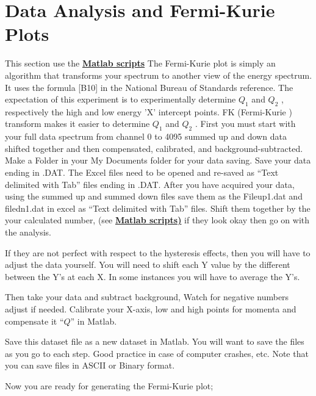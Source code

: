 \documentclass{../lab}
\begin{document}
\section{Data Analysis and Fermi-Kurie Plots}

This section use the \href{http://experimentationlab.berkeley.edu/matlabfitting}{\textbf{Matlab scripts}} The Fermi-Kurie plot is simply an algorithm that transforms your spectrum to another view of the energy spectrum. It uses the formula [B10] in the National Bureau of Standards reference. The expectation of this experiment is to experimentally determine $Q_1$ and $Q_2$ , respectively the high and low energy 'X' intercept points. FK (Fermi-Kurie ) transform makes it easier to determine $Q_1$ and $Q_2$ . First you must start with your full data spectrum from channel 0 to 4095 summed up and down data shifted together and then compensated, calibrated, and background-subtracted. Make a Folder in your My Documents folder for your data saving. Save your data ending in \*.DAT. The Excel files need to be opened and re-saved as ``Text delimited with Tab'' files ending in \*.DAT. After you have acquired your data, using the summed up and summed down files save them as the Fileup1.dat and filedn1.dat in excel as ``Text delimited with Tab'' files. Shift them together by the your calculated number, (see \href{http://experimentationlab.berkeley.edu/matlabfitting}{\textbf{Matlab scripts)}} if they look okay then go on with the analysis.

If they are not perfect with respect to the hysteresis effects, then you will have to adjust the data yourself. You will need to shift each Y value by the different between the Y's at each X. In some instances you will have to average the Y's.

Then take your data and subtract background, Watch for negative numbers adjust if needed. Calibrate your X-axis, low and high points for momenta and compensate it ``$Q$'' in Matlab.

Save this dataset file as a new dataset in Matlab. You will want to save the files as you go to each step. Good practice in case of computer crashes, etc. Note that you can save files in ASCII or Binary format.

Now you are ready for generating the Fermi-Kurie plot;
\end{document}
